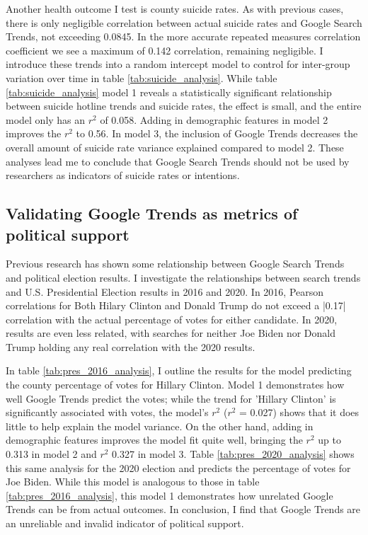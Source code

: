 

Another health outcome I test is county suicide rates. As with previous cases,
there is only negligible correlation between actual suicide rates and Google
Search Trends, not exceeding 0.0845. In the more accurate repeated measures
correlation coefficient we see a maximum of 0.142 correlation, remaining
negligible. I introduce these trends into a random intercept model to control
for inter-group variation over time in table \ref{tab:suicide_analysis}. While
table \ref{tab:suicide_analysis} model 1 reveals a statistically significant relationship
between suicide hotline trends and suicide rates, the effect is small, and the
entire model only has an $r^2$ of 0.058. Adding in demographic features in model
2 improves the $r^2$ to 0.56. In model 3, the inclusion of Google Trends
decreases the overall amount of suicide rate variance explained
compared to model 2. These analyses lead me to conclude that Google Search
Trends should not be used by researchers as indicators of suicide rates or intentions.



\subsection{Validating Google Trends as metrics of political support}

Previous research has shown some relationship between Google Search Trends and
political election results. I investigate the relationships between search trends
and U.S. Presidential Election results in 2016 and 2020. In 2016, Pearson
correlations for Both Hilary Clinton and Donald Trump do not exceed a |0.17|
correlation with the actual percentage of votes for either candidate. In 2020,
results are even less related, with searches for neither Joe Biden nor Donald
Trump holding any real correlation with the 2020 results.

In table \ref{tab:pres_2016_analysis}, I outline the results for the model
predicting the county percentage of votes for Hillary Clinton. Model 1
demonstrates how well Google Trends predict the votes; while the
trend for 'Hillary Clinton' is significantly associated with votes, the model's
$r^2$ ($r^2$ = 0.027) shows that it does little to help explain the model
variance. On the other hand, adding in demographic features improves the model
fit quite well, bringing the $r^2$ up to 0.313 in model 2 and $r^2$ 0.327 in
model 3. Table \ref{tab:pres_2020_analysis} shows this same analysis for the
2020 election and predicts the percentage of votes for Joe Biden. While this
model is analogous to those in table \ref{tab:pres_2016_analysis}, this
model 1 demonstrates how unrelated Google Trends can be from actual outcomes. In
conclusion, I find that Google Trends are an unreliable and invalid indicator of
political support.

